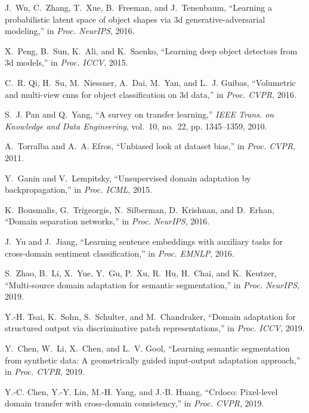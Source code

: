 \documentclass[final]{IEEEtran}
\begin{document}
{\begin{minipage}{\textwidth}
\begin{thebibliography}{1}
J.~Wu, C.~Zhang, T.~Xue, B.~Freeman, and J.~Tenenbaum, ``Learning a
  probabilistic latent space of object shapes via 3d generative-adversarial
  modeling,'' in \emph{Proc. NeurIPS}, 2016.

X.~Peng, B.~Sun, K.~Ali, and K.~Saenko, ``Learning deep object detectors from
  3d models,'' in \emph{Proc. ICCV}, 2015.

C.~R. Qi, H.~Su, M.~Niessner, A.~Dai, M.~Yan, and L.~J. Guibas, ``Volumetric
  and multi-view cnns for object classification on 3d data,'' in \emph{Proc.
  CVPR}, 2016.

S.~J. Pan and Q.~Yang, ``A survey on transfer learning,'' \emph{IEEE Trans. on
  Knowledge and Data Engineering}, vol.~10, no.~22, pp. 1345--1359, 2010.

A.~Torralba and A.~A. Efros, ``Unbiased look at dataset bias,'' in \emph{Proc.
  CVPR}, 2011.

Y.~Ganin and V.~Lempitsky, ``Unsupervised domain adaptation by
  backpropagation,'' in \emph{Proc. ICML}, 2015.

K.~Bousmalis, G.~Trigeorgis, N.~Silberman, D.~Krishnan, and D.~Erhan, ``Domain
  separation networks,'' in \emph{Proc. NeurIPS}, 2016.

J.~Yu and J.~Jiang, ``Learning sentence embeddings with auxiliary tasks for
  cross-domain sentiment classification,'' in \emph{Proc. EMNLP}, 2016.

S.~Zhao, B.~Li, X.~Yue, Y.~Gu, P.~Xu, R.~Hu, H.~Chai, and K.~Keutzer,
  ``Multi-source domain adaptation for semantic segmentation,'' in \emph{Proc.
  NeurIPS}, 2019.

Y.-H. Tsai, K.~Sohn, S.~Schulter, and M.~Chandraker, ``Domain adaptation for
  structured output via discriminative patch representations,'' in \emph{Proc.
  ICCV}, 2019.

Y.~Chen, W.~Li, X.~Chen, and L.~V. Gool, ``Learning semantic segmentation from
  synthetic data: A geometrically guided input-output adaptation approach,'' in
  \emph{Proc. CVPR}, 2019.

Y.-C. Chen, Y.-Y. Lin, M.-H. Yang, and J.-B. Huang, ``Crdoco: Pixel-level
  domain transfer with cross-domain consistency,'' in \emph{Proc. CVPR}, 2019.


\end{thebibliography}
\end{minipage}}
\end{document}
